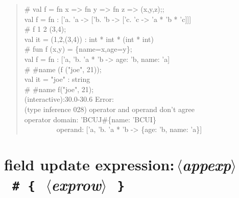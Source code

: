 \documentclass{jbook}
\newcommand{\txt}[2]{#2}
\newcommand{\nonterm}[1]{\mbox{$\,\langle$}{\it #1}\mbox{$\rangle\,$}}
\newcommand{\term}[1]{\mbox{{\tt #1}}}
\newcommand{\myem}{\mbox{\ \ }}
\newenvironment{program}{\begin{quote}\begin{tt}}%
                        {\end{tt}\end{quote}}
\begin{document}
\begin{program}
\# val f = fn x => fn y => fn z => (x,y,z);;
\\
val f = fn : ['a. 'a -> ['b. 'b -> ['c. 'c -> 'a * 'b * 'c]]]
\\
\# f 1 2 (3,4);
\\
val it = (1,2,(3,4)) : int * int * (int * int)
\\
\# fun f (x,y) = \{name=x,age=y\};
\\
val f = fn : ['a, 'b. 'a * 'b -> {age: 'b, name: 'a}]
\\
\# \#name (f ("joe", 21));
\\
val it = "joe" : string
\\
\# \#name f("joe", 21);
\\
(interactive):30.0-30.6 Error:
\\
  (type inference 028) operator and operand don't agree
\\
  operator domain: 'BCUJ\#\{name: 'BCUI\}
\\
\myem\myem\myem\myem\          operand: ['a, 'b. 'a * 'b -> \{age: 'b, name: 'a\}]
\end{program}


\section{\txt{フィールドアップデート式}{field update expression}:\nonterm{appexp}\ \term{\#}\ \term{\{}\ \nonterm{exprow}\ \term{\}}}
\end{document}
